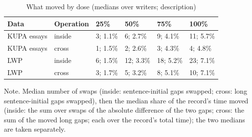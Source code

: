 \begin{table}[htbp]
\caption{What moved by dose (medians over writers; description)}
\label{tab:moved}
\footnotesize
\begin{tabularx}{\linewidth}{@{}llXXXX@{}}
\toprule
Data & Operation & 25\% & 50\% & 75\% & 100\% \\
\midrule
KUPA essays & inside & 3; 1.1\% & 6; 2.7\% & 9; 4.1\% & 11; 5.7\% \\
KUPA essays & cross & 1; 1.5\% & 2; 2.6\% & 3; 4.3\% & 4; 4.8\% \\
LWP & inside & 6; 1.5\% & 12; 3.3\% & 18; 5.2\% & 23; 7.1\% \\
LWP & cross & 3; 1.7\% & 5; 3.2\% & 8; 5.1\% & 10; 7.1\% \\
\bottomrule
\end{tabularx}
\par\smallskip\footnotesize Note. Median number of swaps (inside: sentence-initial gaps swapped; cross: long sentence-initial gaps swapped), then the median share of the record's time moved (inside: the sum over swaps of the absolute difference of the two gaps; cross: the sum of the moved long gaps; each over the record's total time); the two medians are taken separately.
\end{table}
